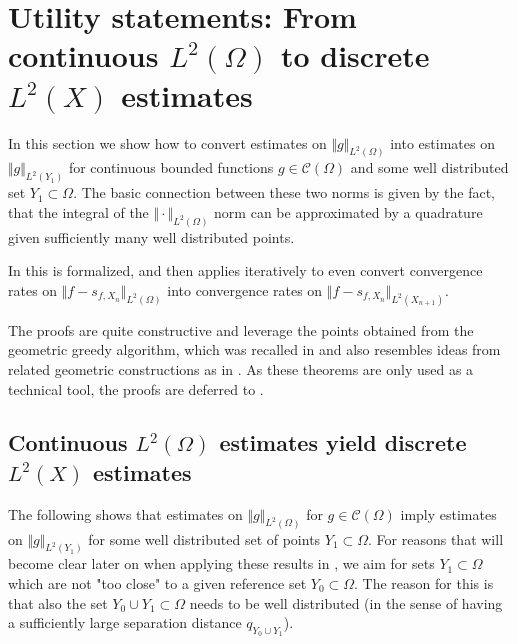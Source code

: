 \documentclass[a4paper, 10pt]{article}
\begin{document}
%



%
%
%
%
%
%
%
%
%
%
%
%
%
%
%
%
%
%
%
%
%
%
%
%
%
%
%
%
%
%
%
%
%
%
%
%
%
%
%
%
%
%
%
%
%
%
%
%
%
%
%
%
%
%
%
%
%
%
%
%
%
%
%
%
%
%
%
%
%
%
%




%
%
%
%
%
%
%
%
%
%
%
%
%
%
%




\section{Utility statements: From continuous $L^2(\Omega)$ to discrete $L^2(X)$ estimates}
\label{sec:utility_statements}

%

In this section we show how to convert estimates on $\Vert g \Vert_{L^2(\Omega)}$ into estimates on $\Vert g \Vert_{L^2(Y_1)}$ for continuous bounded functions $g \in \mathcal{C}(\Omega)$ and some well distributed set $Y_1 \subset \Omega$.
The basic connection between these two norms is given by the fact, that the integral of the $\Vert \cdot \Vert_{L^2(\Omega)}$ norm can be approximated by a quadrature given sufficiently many well distributed points.

In  this is formalized, 
and then  applies  iteratively to even convert convergence rates on $\Vert f - s_{f, X_n} \Vert_{L^2(\Omega)}$ into convergence rates on $\Vert f - s_{f, X_n} \Vert_{L^2(X_{n+1})}$.
%
%

The proofs are quite constructive and leverage the points obtained from the geometric greedy algorithm, which was recalled in  and also resembles ideas from related geometric constructions as in
\cite{duchon1978erreur, rieger2008sampling, rieger2010sampling}.
As these theorems are only used as a technical tool, the proofs are deferred to .

\subsection{Continuous $L^2(\Omega)$ estimates yield discrete $L^2(X)$ estimates}


The following  shows that estimates on $\Vert g \Vert_{L^2(\Omega)}$ for $g \in \mathcal{C}(\Omega)$ imply estimates on $\Vert g \Vert_{L^2(Y_1)}$ for some well distributed set of points $Y_1 \subset \Omega$.
For reasons that will become clear later on when applying these results in , we aim for sets $Y_1 \subset \Omega$ which are not "too close" to a given reference set $Y_0 \subset \Omega$.
The reason for this is that also the set $Y_0 \cup Y_1 \subset \Omega$ needs to be well distributed (in the sense of having a sufficiently large separation distance $q_{Y_0 \cup Y_1}$). 
\end{document}
